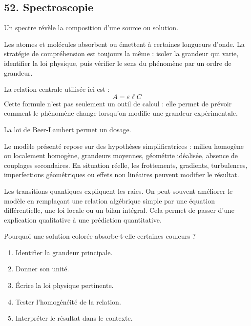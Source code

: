 \documentclass[11pt,a4paper]{article}
\begin{document}
\subsection{52. Spectroscopie}

\begin{exemplebox}
Un spectre révèle la composition d'une source ou solution.
\end{exemplebox}

\begin{methodebox}
Les atomes et molécules absorbent ou émettent à certaines longueurs d'onde.
La stratégie de compréhension est toujours la même : isoler la grandeur qui varie, identifier la loi physique, puis vérifier le sens du phénomène par un ordre de grandeur.
\end{methodebox}

\begin{theorembox}
La relation centrale utilisée ici est :
\[
A=\varepsilon \ell C
\]
Cette formule n'est pas seulement un outil de calcul : elle permet de prévoir comment le phénomène change lorsqu'on modifie une grandeur expérimentale.
\end{theorembox}

\begin{odgbox}
La loi de Beer-Lambert permet un dosage.
\end{odgbox}

\begin{attentionbox}
Le modèle présenté repose sur des hypothèses simplificatrices : milieu homogène ou localement homogène, grandeurs moyennes, géométrie idéalisée, absence de couplages secondaires. En situation réelle, les frottements, gradients, turbulences, imperfections géométriques ou effets non linéaires peuvent modifier le résultat.
\end{attentionbox}

\begin{approfondissementbox}
Les transitions quantiques expliquent les raies.
On peut souvent améliorer le modèle en remplaçant une relation algébrique simple par une équation différentielle, une loi locale ou un bilan intégral. Cela permet de passer d'une explication qualitative à une prédiction quantitative.
\end{approfondissementbox}

\begin{exercicebox}
Pourquoi une solution colorée absorbe-t-elle certaines couleurs ?
\begin{enumerate}
  \item Identifier la grandeur principale.
  \item Donner son unité.
  \item Écrire la loi physique pertinente.
  \item Tester l'homogénéité de la relation.
  \item Interpréter le résultat dans le contexte.
\end{enumerate}
\end{exercicebox}
\end{document}
